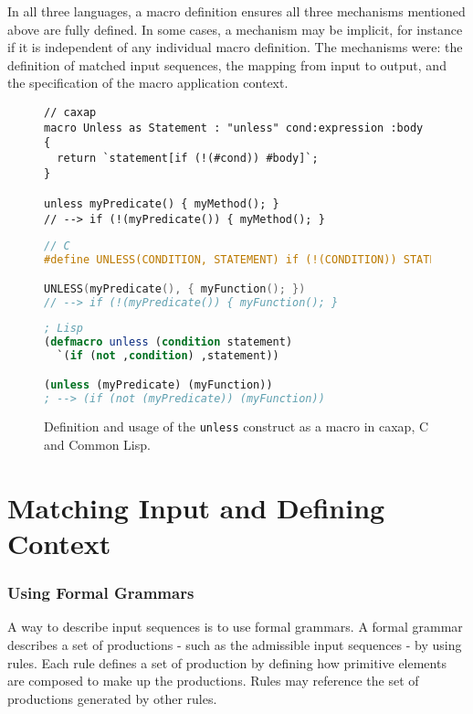 In all three languages, a macro definition ensures all three mechanisms
mentioned above are fully defined. In some cases, a mechanism may be implicit,
for instance if it is independent of any individual macro definition. The
mechanisms were: the definition of matched input sequences, the mapping from
input to output, and the specification of the macro application context.

\begin{figure}[here]
\small
\begin{lstlisting}[frame=single,language=caxap]
// caxap
macro Unless as Statement : "unless" cond:expression :body
{
  return `statement[if (!(#cond)) #body]`;
}

unless myPredicate() { myMethod(); }
// --> if (!(myPredicate()) { myMethod(); }
\end{lstlisting}

\begin{lstlisting}[frame=single,language=C]
// C
#define UNLESS(CONDITION, STATEMENT) if (!(CONDITION)) STATEMENT

UNLESS(myPredicate(), { myFunction(); })
// --> if (!(myPredicate()) { myFunction(); }
\end{lstlisting}

\begin{lstlisting}[frame=single,language=Lisp]
; Lisp
(defmacro unless (condition statement)
  `(if (not ,condition) ,statement))

(unless (myPredicate) (myFunction))
; --> (if (not (myPredicate)) (myFunction))
\end{lstlisting}
\caption{Definition and usage of the \texttt{unless} construct as a macro in
  caxap, C and Common Lisp.}
\label{macro_example}
\end{figure}

\section{Matching Input and Defining Context}

\subsubsection{Using Formal Grammars}

A way to describe input sequences is to use formal grammars. A formal grammar
describes a set of productions - such as the admissible input sequences - by
using rules. Each rule defines a set of production by defining how primitive
elements are composed to make up the productions. Rules may reference the set of
productions generated by other rules.

